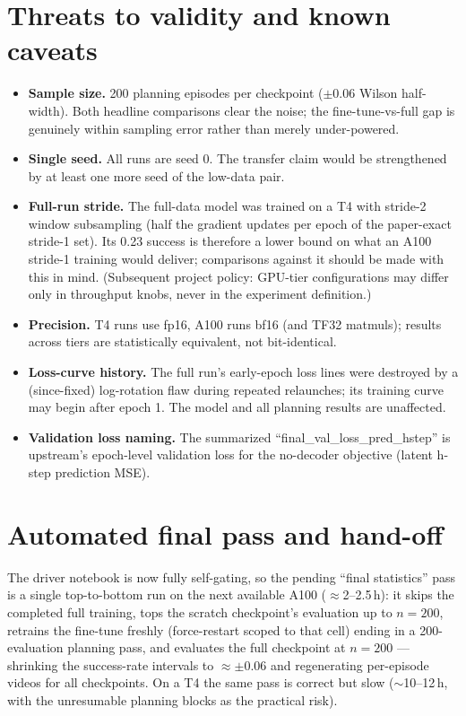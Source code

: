 \documentclass[11pt]{article}
\begin{document}
\section{Threats to validity and known caveats}
\label{sec:caveats}

\begin{itemize}
\item \textbf{Sample size.} 200 planning episodes per checkpoint ($\pm0.06$
      Wilson half-width). Both headline comparisons clear the noise; the
      fine-tune-vs-full gap is genuinely within sampling error rather than
      merely under-powered.
\item \textbf{Single seed.} All runs are seed 0. The transfer claim would be
      strengthened by at least one more seed of the low-data pair.
\item \textbf{Full-run stride.} The full-data model was trained on a T4 with
      stride-2 window subsampling (half the gradient updates per epoch of
      the paper-exact stride-1 set). Its 0.23 success is therefore a lower
      bound on what an A100 stride-1 training would deliver; comparisons
      against it should be made with this in mind. (Subsequent project
      policy: GPU-tier configurations may differ only in throughput knobs,
      never in the experiment definition.)
\item \textbf{Precision.} T4 runs use fp16, A100 runs bf16 (and TF32
      matmuls); results across tiers are statistically equivalent, not
      bit-identical.
\item \textbf{Loss-curve history.} The full run's early-epoch loss lines were
      destroyed by a (since-fixed) log-rotation flaw during repeated
      relaunches; its training curve may begin after epoch 1. The model and
      all planning results are unaffected.
\item \textbf{Validation loss naming.} The summarized
      ``final\_val\_loss\_pred\_hstep'' is upstream's epoch-level validation
      loss for the no-decoder objective (latent h-step prediction MSE).
\end{itemize}

\section{Automated final pass and hand-off}

The driver notebook is now fully self-gating, so the pending ``final
statistics'' pass is a single top-to-bottom run on the next available A100
($\approx$2--2.5\,h): it skips the completed full training, tops the scratch
checkpoint's evaluation up to $n{=}200$, retrains the fine-tune freshly
(force-restart scoped to that cell) ending in a 200-evaluation planning pass,
and evaluates the full checkpoint at $n{=}200$ --- shrinking the success-rate
intervals to $\approx\pm0.06$ and regenerating per-episode videos for all
checkpoints. On a T4 the same pass is correct but slow ($\sim$10--12\,h,
with the unresumable planning blocks as the practical risk).
\end{document}
